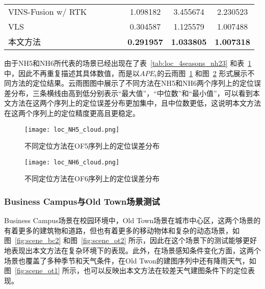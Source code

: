 \begin{table}
\begin{tabular}{lccccccc}
VINS-Fusion w/ RTK &                                                                                &                     &                     &                     & 1.098182          & 3.455674          & 2.230523          \\
VLS                &                                                                                &                     &                     &                     & 0.304587          & 1.125579          & 1.007488          \\
本文方法               &                                                                                &                     &                     &                     & \cellcolor[HTML]{FFCCC9}\textbf{0.291957} & \cellcolor[HTML]{FFCCC9}\textbf{1.033805} & \cellcolor[HTML]{FFCCC9}\textbf{1.007318} \\ \bottomrule
\end{tabular}
\label{tab:loc_4seasons_nh47}
\end{table}

由于NH5和NH6所代表的场景已经出现在了表~\ref{tab:loc_4seasons_nh23} 和表~\ref{tab:loc_4seasons_nh47} 中，因此不再重复描述其具体数值，而是以$APE_t$的云雨图~\ref{fig:loc_4seaons_nh5} 和图~\ref{fig:loc_4seaons_nh6} 形式展示不同方法的定位结果。云雨图图中展示了不同方法在NH5和NH6两个序列上的定位误差分布，三条横线由高到低分别表示“最大值”，“中位数”和“最小值”，可以看到本文方法在这两个序列上的定位误差分布更加集中，且中位数更低，这说明本文方法在这两个序列上的定位精度更高且更稳定。

\begin{figure}
  \centering
  \texttt{[image: loc\_NH5\_cloud.png]}
  \caption{不同定位方法在OF5序列上的定位误差分布}
  \label{fig:loc_4seaons_nh5}
\end{figure}

\begin{figure}
  \centering
  \texttt{[image: loc\_NH6\_cloud.png]}
  \caption{不同定位方法在OF6序列上的定位误差分布}
  \label{fig:loc_4seaons_nh6}
\end{figure}

\subsubsection{Business Campus与Old Town场景测试}

Business Campus场景在校园环境中，Old Town场景在城市中心区，这两个场景的有着更多的建筑物和道路，但也有着更多的移动物体和复杂的动态场景，如图~\ref{fig:scene_bc2} 和图~\ref{fig:scene_ot2} 所示，因此在这个场景下的测试能够更好地表现出本文方法在复杂环境下的表现。此外，在场景感知条件变化方面，这两个场景也覆盖了多种季节和天气条件，在Old Twon的建图序列中还有降雨天气，如图~\ref{fig:scene_ot1} 所示，也可以反映出本文方法在较差天气建图条件下的定位表现。

